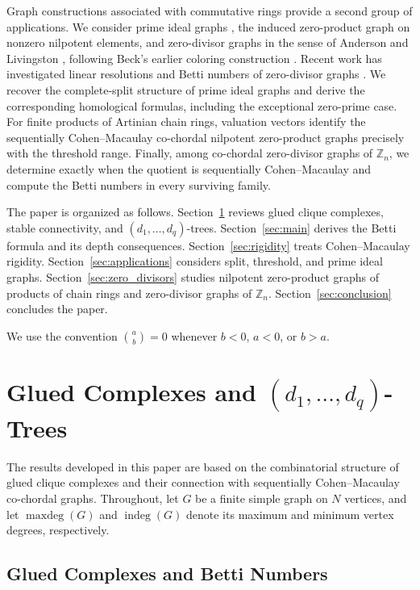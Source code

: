 \documentclass[12pt, reqno]{amsart}
\theoremstyle{definition}
\numberwithin{equation}{section}
\begin{document}
Graph constructions associated with commutative rings provide a second group of applications.  We consider prime ideal graphs \cite{salih2022,rasheed2026}, the induced zero-product graph on nonzero nilpotent elements, and zero-divisor graphs in the sense of Anderson and Livingston \cite{anderson1999}, following Beck's earlier coloring construction \cite{beck1988}.  Recent work has investigated linear resolutions and Betti numbers of zero-divisor graphs \cite{rather2024_zd,dung2026,rather2026}.  We recover the complete-split structure of prime ideal graphs and derive the corresponding homological formulas, including the exceptional zero-prime case.  For finite products of Artinian chain rings, valuation vectors identify the sequentially Cohen--Macaulay co-chordal nilpotent zero-product graphs precisely with the threshold range.  Finally, among co-chordal zero-divisor graphs of $\mathbb Z_n$, we determine exactly when the quotient is sequentially Cohen--Macaulay and compute the Betti numbers in every surviving family.

The paper is organized as follows.  Section~\ref{sec:preliminaries} reviews glued clique complexes, stable connectivity, and $(d_1,\ldots,d_q)$-trees.  Section~\ref{sec:main} derives the Betti formula and its depth consequences.  Section~\ref{sec:rigidity} treats Cohen--Macaulay rigidity.  Section~\ref{sec:applications} considers split, threshold, and prime ideal graphs.  Section~\ref{sec:zero_divisors} studies nilpotent zero-product graphs of products of chain rings and zero-divisor graphs of $\mathbb Z_n$.  Section~\ref{sec:conclusion} concludes the paper.

We use the convention $\binom{a}{b}=0$ whenever $b<0$, $a<0$, or $b>a$.

\section{Glued Complexes and \texorpdfstring{$(d_1,\dots,d_q)$}{(d1,...,dq)}-Trees} \label{sec:preliminaries}
	
	The results developed in this paper are based on the combinatorial structure of glued clique complexes and their connection with sequentially Cohen--Macaulay co-chordal graphs. Throughout, let $G$ be a finite simple graph on $N$ vertices, and let $\operatorname{maxdeg}(G)$ and $\operatorname{indeg}(G)$ denote its maximum and minimum vertex degrees, respectively.
	
	\subsection{Glued Complexes and Betti Numbers}
\end{document}
